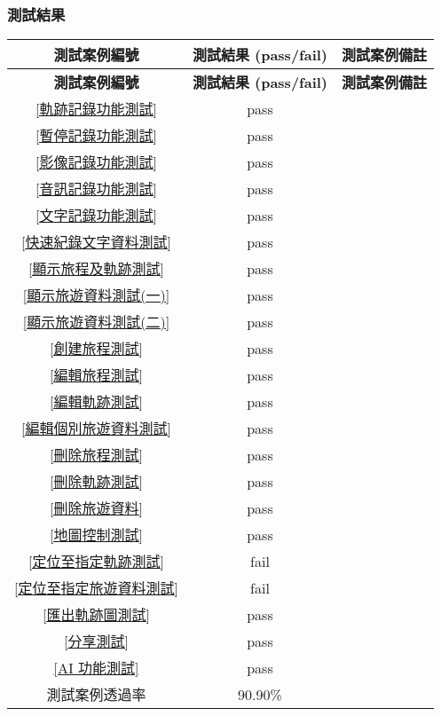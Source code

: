 \subsubsection{測試結果}


\begin{longtable}{|c|c|p{8.9cm}|}
  \hline
  \textbf{測試案例編號} & \textbf{測試結果 (pass/fail)} & \textbf{測試案例備註} \\
  \hline
  \endfirsthead
  \hline
  \textbf{測試案例編號} & \textbf{測試結果 (pass/fail)} & \textbf{測試案例備註} \\
  \hline
  \endhead
  \ref{軌跡記錄功能測試} & pass & \\ 
  \hline
  \ref{暫停記錄功能測試} & pass & \\ 
  \hline
  \ref{影像記錄功能測試} & pass & \\ 
  \hline
  \ref{音訊記錄功能測試} & pass & \\ 
  \hline
  \ref{文字記錄功能測試} & pass & \\ 
  \hline
  \ref{快速紀錄文字資料測試} & pass & \\ 
  \hline
  \ref{顯示旅程及軌跡測試} & pass & \\ 
  \hline
  \ref{顯示旅遊資料測試(一)} & pass & \\ 
  \hline
  \ref{顯示旅遊資料測試(二)} & pass & \\ 
  \hline
  \ref{創建旅程測試} & pass & \\ 
  \hline
  \ref{編輯旅程測試} & pass & \\ 
  \hline
  \ref{編輯軌跡測試} & pass & \\ 
  \hline
  \ref{編輯個別旅遊資料測試} & pass & \\ 
  \hline
  \ref{刪除旅程測試} & pass & \\ 
  \hline
  \ref{刪除軌跡測試} & pass & \\ 
  \hline
  \ref{刪除旅遊資料} & pass & \\ 
  \hline
  \ref{地圖控制測試} & pass & \\ 
  \hline
  \rowcolor{orange!25} \ref{定位至指定軌跡測試} & fail &  \\ 
  \hline
  \rowcolor{orange!25} \ref{定位至指定旅遊資料測試} & fail &  \\ 
  \hline
  \ref{匯出軌跡圖測試} & pass & \\ 
  \hline
  \ref{分享測試} & pass & \\ 
  \hline
  \ref{AI 功能測試} & pass & \\ 
  \hline
  測試案例透過率 & 90.90\% & \\
  \hline
\end{longtable}

